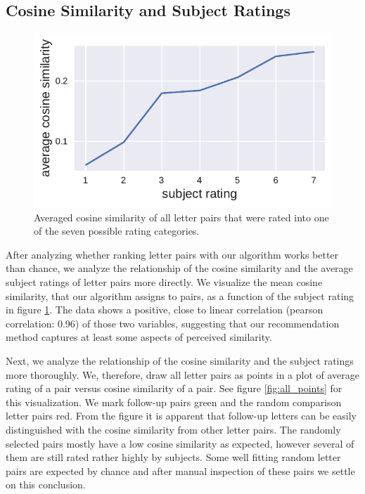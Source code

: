 \justifying


\subsection*{Cosine Similarity and Subject Ratings}


\begin{figure}
	\begin{center}
		\includegraphics[width=0.98\linewidth]{figures/rating_vs_sim_mean}
	\end{center}
	\caption{Averaged cosine similarity of all letter pairs that were rated into one of the seven possible rating categories.}
	\label{fig:rating_vs_sim}
\end{figure} 
After analyzing whether ranking letter pairs with our algorithm works better than chance, we analyze the relationship of the cosine similarity and the average subject ratings of letter pairs more directly. We visualize the mean cosine similarity, that our algorithm assigns to pairs, as a function of the subject rating in figure \ref{fig:rating_vs_sim}. The data shows a positive, close to linear correlation (pearson correlation: 0.96) of those two variables, suggesting that our recommendation method captures at least some aspects of perceived similarity.

%	
%		
Next, we analyze the relationship of the cosine similarity and the subject ratings more thoroughly. We, therefore, draw all letter pairs as points in a plot of average rating of a pair versus cosine similarity of a pair. See figure \ref{fig:all_points} for this visualization. We mark follow-up pairs green and the random comparison letter pairs red. From the figure it is apparent that follow-up letters can be easily distinguished with the cosine similarity from other letter pairs. The randomly selected pairs mostly have a low cosine similarity as expected, however several of them are still rated rather highly by subjects. Some well fitting random letter pairs are expected by chance and after manual inspection of these pairs we settle on this conclusion.




